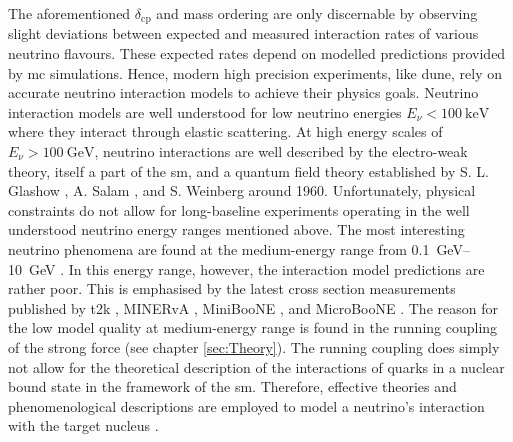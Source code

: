 The aforementioned $\delta_\text{cp}$ and mass ordering are only discernable by observing slight deviations between expected and measured interaction rates of various neutrino flavours. These expected rates depend \ia on modelled predictions provided by \gls{mc} simulations. Hence, modern high precision experiments, like \gls{dune}, rely on accurate neutrino interaction models to achieve their physics goals. Neutrino interaction models are well understood for low neutrino energies $E_\nu < \SI{100}{\kilo\electronvolt}$ where they interact through elastic scattering. At high energy scales of $E_\nu > \SI{100}{\giga\electronvolt}$, neutrino interactions are well described by the electro-weak theory, itself a part of the \gls{sm}, and a quantum field theory established by S. L. Glashow \cite{ElectroweakGlashow}, A. Salam \cite{ElectroweakSalam}, and S. Weinberg \cite{ElectroweakWeinberg} around 1960. Unfortunately, physical constraints do not allow for long-baseline experiments operating in the well understood neutrino energy ranges mentioned above. The most interesting neutrino phenomena are found at the medium-energy range from \SIrange{0.1}{10}{\giga\electronvolt} \cite{ProgressInNuMeasurements}. In this energy range, however, the interaction model predictions are rather poor. This is emphasised by the latest cross section measurements published by \gls{t2k} \cite{CrossSectionT2K}, MINERvA \cite{CrossSectionMinerva}, MiniBooNE \cite{AxialMassMiniBooNE}, and MicroBooNE \cite{MicroBooNEFirstCCInclPublished}. The reason for the low model quality at medium-energy range is found in the running coupling of the strong force (see chapter \ref{sec:Theory}). The running coupling does simply not allow for the theoretical description of the interactions of quarks in a nuclear bound state in the framework of the \gls{sm}. Therefore, effective theories and phenomenological descriptions are employed to model a neutrino's interaction with the target nucleus \cite{GenieGenerator,GenieTools}.

